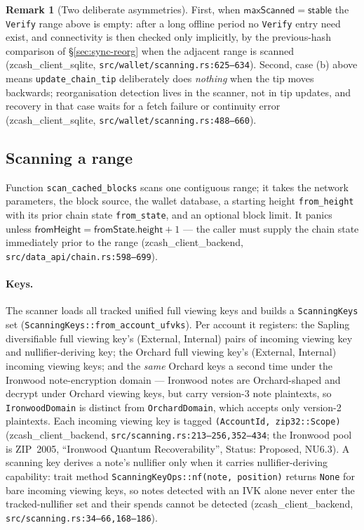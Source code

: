 \documentclass[11pt,a4paper]{article}
\theoremstyle{definition}
\newtheorem{remark}[theorem]{Remark}
\begin{document}
\begin{remark}[Two deliberate asymmetries]\label{rem:sync-tip-asymmetries}
First, when $\mathsf{maxScanned} = \mathsf{stable}$ the \texttt{Verify}
range above is empty: after a long offline period no \texttt{Verify} entry
need exist, and connectivity is then checked only implicitly, by the
previous-hash comparison of \S\ref{sec:sync-reorg} when the adjacent range
is scanned (\textsf{zcash\_client\_sqlite},
\texttt{src/wallet/scanning.rs:625--634}).
Second, case (b) above means \texttt{update\_chain\_tip} deliberately does
\emph{nothing} when the tip moves backwards; reorganisation detection lives
in the scanner, not in tip updates, and recovery in that case waits for a
fetch failure or continuity error
(\textsf{zcash\_client\_sqlite}, \texttt{src/wallet/scanning.rs:488--660}).
\end{remark}

\subsection{Scanning a range}\label{sec:sync-scan}

Function \texttt{scan\_cached\_blocks} scans one contiguous range; it
takes the network parameters, the block source, the wallet database, a
starting height \texttt{from\_height} with its prior chain state
\texttt{from\_state}, and an optional block limit. It panics unless
$\mathsf{fromHeight} = \mathsf{fromState.height} + 1$ --- the caller must
supply the chain state immediately prior to the range
(\textsf{zcash\_client\_backend}, \texttt{src/data\_api/chain.rs:598--699}).

\paragraph{Keys.} The scanner loads all tracked unified full viewing keys
and builds a \texttt{ScanningKeys} set
(\texttt{ScanningKeys::from\_account\_ufvks}). Per account it registers:
the Sapling diversifiable full viewing key's (External, Internal) pairs of
incoming viewing key and nullifier-deriving key; the Orchard full viewing
key's (External, Internal) incoming viewing keys; and the \emph{same}
Orchard keys a second time under the Ironwood note-encryption domain ---
Ironwood notes are Orchard-shaped and decrypt under Orchard viewing keys,
but carry version-3 note plaintexts, so \texttt{IronwoodDomain} is distinct
from \texttt{OrchardDomain}, which accepts only version-2 plaintexts. Each
incoming viewing key is tagged \texttt{(AccountId, zip32::Scope)}
(\textsf{zcash\_client\_backend}, \texttt{src/scanning.rs:213--256,352--434};
the
Ironwood pool is ZIP~2005, ``Ironwood Quantum Recoverability'', Status:
Proposed, NU6.3). A scanning
key derives a note's nullifier only when it carries nullifier-deriving
capability: trait method \texttt{ScanningKeyOps::nf(note, position)}
returns \texttt{None} for bare incoming viewing keys, so notes detected
with an IVK alone never enter the tracked-nullifier set and their spends
cannot be detected
(\textsf{zcash\_client\_backend}, \texttt{src/scanning.rs:34--66,168--186}).
\end{document}

